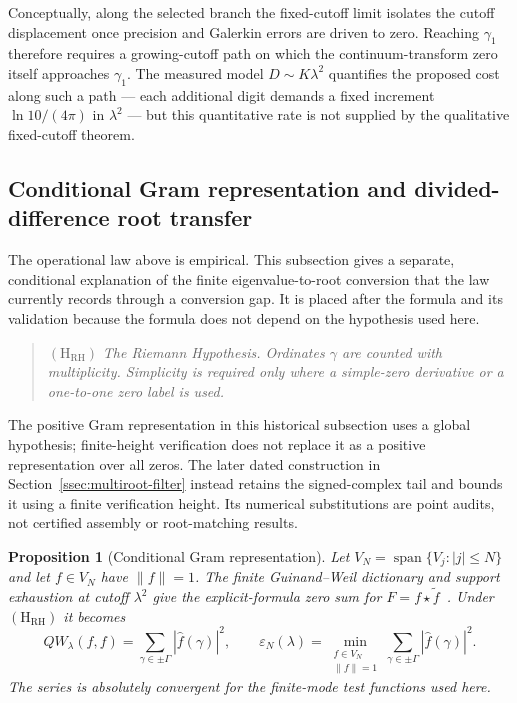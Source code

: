 \documentclass[11pt,a4paper]{article}
\newtheorem{proposition}{Proposition}
\begin{document}
Conceptually, along the selected branch the fixed-cutoff limit isolates the
cutoff displacement once precision and Galerkin errors are driven to zero.
Reaching $\gamma_1$ therefore requires a growing-cutoff path on which the
continuum-transform zero itself approaches $\gamma_1$. The measured model
$D\sim K\lambda^2$ quantifies the proposed cost along such a path --- each
additional digit demands a fixed increment $\ln10/(4\pi)$ in $\lambda^2$ ---
but this quantitative rate is not supplied by the qualitative fixed-cutoff
theorem.


\subsection{Conditional Gram representation and divided-difference root transfer}
\label{ssec:gramdd}

The operational law above is empirical. This subsection gives a separate,
conditional explanation of the finite eigenvalue-to-root conversion that the
law currently records through a conversion gap. It is placed after the formula
and its validation because the formula does not depend on the hypothesis used
here.

\begin{quote}
\textbf{$(\mathrm{H}_{\mathrm{RH}})$} \emph{The Riemann Hypothesis. Ordinates
$\gamma$ are counted with multiplicity. Simplicity is required only where a
simple-zero derivative or a one-to-one zero label is used.}
\end{quote}

The positive Gram representation in this historical subsection uses a global
hypothesis; finite-height verification does not replace it as a positive
representation over all zeros.  The later dated construction in
Section~\ref{ssec:multiroot-filter} instead retains the signed-complex tail
and bounds it using a finite verification height. Its numerical substitutions
are point audits, not certified assembly or root-matching results.

\begin{proposition}[Conditional Gram representation]
\label{prop:gram}
Let $V_N=\operatorname{span}\{V_j:|j|\le N\}$ and let $f\in V_N$ have
$\|f\|=1$. The finite Guinand--Weil dictionary and support exhaustion at
cutoff $\lambda^2$ give the explicit-formula zero sum for
$F=f\star\widetilde f$~\cite{GroskinGW2026}. Under
$(\mathrm{H}_{\mathrm{RH}})$ it becomes
\begin{equation}\label{eq:gram}
 QW_\lambda(f,f)=\sum_{\gamma\in\pm\Gamma}|\widehat f(\gamma)|^2,
 \qquad
 \varepsilon_N(\lambda)=
 \min_{\substack{f\in V_N\\ \|f\|=1}}
 \sum_{\gamma\in\pm\Gamma}|\widehat f(\gamma)|^2 .
\end{equation}
The series is absolutely convergent for the finite-mode test functions used
here.
\end{proposition}
\end{document}
